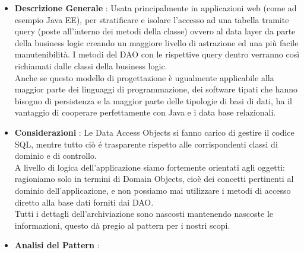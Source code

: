 {{{			\begin{itemize}\itemsep1pt
				\item \textbf{Descrizione Generale} : Usata principalmente in applicazioni web (come ad esempio Java EE), per stratificare e isolare l'accesso ad una tabella tramite query (poste all'interno dei metodi della classe) ovvero al data layer da parte della business logic creando un maggiore livello di astrazione ed una più facile manutenibilità. I metodi del DAO con le rispettive query dentro verranno così richiamati dalle classi della business logic.\\ 
				Anche se questo modello di progettazione è ugualmente applicabile alla maggior parte dei linguaggi di programmazione, dei software tipati che hanno bisogno di persistenza e la maggior parte delle tipologie di basi di dati, ha il vantaggio di cooperare perfettamente con Java e i data base relazionali.
				\item \textbf{Considerazioni} : Le Data Access Objects si fanno carico di gestire il codice SQL, mentre tutto ciò é trasparente rispetto alle corrispondenti classi di dominio e di controllo.\\ 
				A livello di logica dell'applicazione siamo fortemente orientati agli oggetti: ragioniamo solo in termini di Domain Objects, cioè dei concetti pertinenti al dominio dell'applicazione, e non possiamo mai utilizzare i metodi di accesso diretto alla base dati forniti dai DAO. \\
				Tutti i dettagli dell'archiviazione sono nascosti mantenendo nascoste le informazioni, questo dà pregio al pattern per i nostri scopi.
				\item \textbf{Analisi del Pattern} : \hfill
				

\end{itemize}}}}
